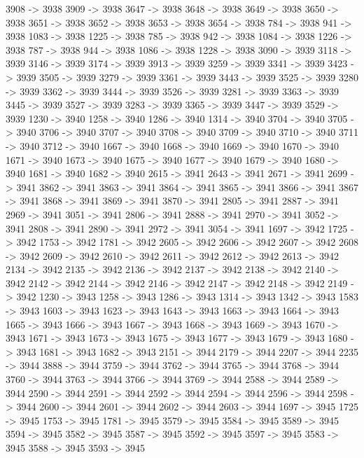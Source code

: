 {	3908 -> 3938
	3909 -> 3938
	3647 -> 3938
	3648 -> 3938
	3649 -> 3938
	3650 -> 3938
	3651 -> 3938
	3652 -> 3938
	3653 -> 3938
	3654 -> 3938
	784 -> 3938
	941 -> 3938
	1083 -> 3938
	1225 -> 3938
	785 -> 3938
	942 -> 3938
	1084 -> 3938
	1226 -> 3938
	787 -> 3938
	944 -> 3938
	1086 -> 3938
	1228 -> 3938
	3090 -> 3939
	3118 -> 3939
	3146 -> 3939
	3174 -> 3939
	3913 -> 3939
	3259 -> 3939
	3341 -> 3939
	3423 -> 3939
	3505 -> 3939
	3279 -> 3939
	3361 -> 3939
	3443 -> 3939
	3525 -> 3939
	3280 -> 3939
	3362 -> 3939
	3444 -> 3939
	3526 -> 3939
	3281 -> 3939
	3363 -> 3939
	3445 -> 3939
	3527 -> 3939
	3283 -> 3939
	3365 -> 3939
	3447 -> 3939
	3529 -> 3939
	1230 -> 3940
	1258 -> 3940
	1286 -> 3940
	1314 -> 3940
	3704 -> 3940
	3705 -> 3940
	3706 -> 3940
	3707 -> 3940
	3708 -> 3940
	3709 -> 3940
	3710 -> 3940
	3711 -> 3940
	3712 -> 3940
	1667 -> 3940
	1668 -> 3940
	1669 -> 3940
	1670 -> 3940
	1671 -> 3940
	1673 -> 3940
	1675 -> 3940
	1677 -> 3940
	1679 -> 3940
	1680 -> 3940
	1681 -> 3940
	1682 -> 3940
	2615 -> 3941
	2643 -> 3941
	2671 -> 3941
	2699 -> 3941
	3862 -> 3941
	3863 -> 3941
	3864 -> 3941
	3865 -> 3941
	3866 -> 3941
	3867 -> 3941
	3868 -> 3941
	3869 -> 3941
	3870 -> 3941
	2805 -> 3941
	2887 -> 3941
	2969 -> 3941
	3051 -> 3941
	2806 -> 3941
	2888 -> 3941
	2970 -> 3941
	3052 -> 3941
	2808 -> 3941
	2890 -> 3941
	2972 -> 3941
	3054 -> 3941
	1697 -> 3942
	1725 -> 3942
	1753 -> 3942
	1781 -> 3942
	2605 -> 3942
	2606 -> 3942
	2607 -> 3942
	2608 -> 3942
	2609 -> 3942
	2610 -> 3942
	2611 -> 3942
	2612 -> 3942
	2613 -> 3942
	2134 -> 3942
	2135 -> 3942
	2136 -> 3942
	2137 -> 3942
	2138 -> 3942
	2140 -> 3942
	2142 -> 3942
	2144 -> 3942
	2146 -> 3942
	2147 -> 3942
	2148 -> 3942
	2149 -> 3942
	1230 -> 3943
	1258 -> 3943
	1286 -> 3943
	1314 -> 3943
	1342 -> 3943
	1583 -> 3943
	1603 -> 3943
	1623 -> 3943
	1643 -> 3943
	1663 -> 3943
	1664 -> 3943
	1665 -> 3943
	1666 -> 3943
	1667 -> 3943
	1668 -> 3943
	1669 -> 3943
	1670 -> 3943
	1671 -> 3943
	1673 -> 3943
	1675 -> 3943
	1677 -> 3943
	1679 -> 3943
	1680 -> 3943
	1681 -> 3943
	1682 -> 3943
	2151 -> 3944
	2179 -> 3944
	2207 -> 3944
	2235 -> 3944
	3888 -> 3944
	3759 -> 3944
	3762 -> 3944
	3765 -> 3944
	3768 -> 3944
	3760 -> 3944
	3763 -> 3944
	3766 -> 3944
	3769 -> 3944
	2588 -> 3944
	2589 -> 3944
	2590 -> 3944
	2591 -> 3944
	2592 -> 3944
	2594 -> 3944
	2596 -> 3944
	2598 -> 3944
	2600 -> 3944
	2601 -> 3944
	2602 -> 3944
	2603 -> 3944
	1697 -> 3945
	1725 -> 3945
	1753 -> 3945
	1781 -> 3945
	3579 -> 3945
	3584 -> 3945
	3589 -> 3945
	3594 -> 3945
	3582 -> 3945
	3587 -> 3945
	3592 -> 3945
	3597 -> 3945
	3583 -> 3945
	3588 -> 3945
	3593 -> 3945
}
